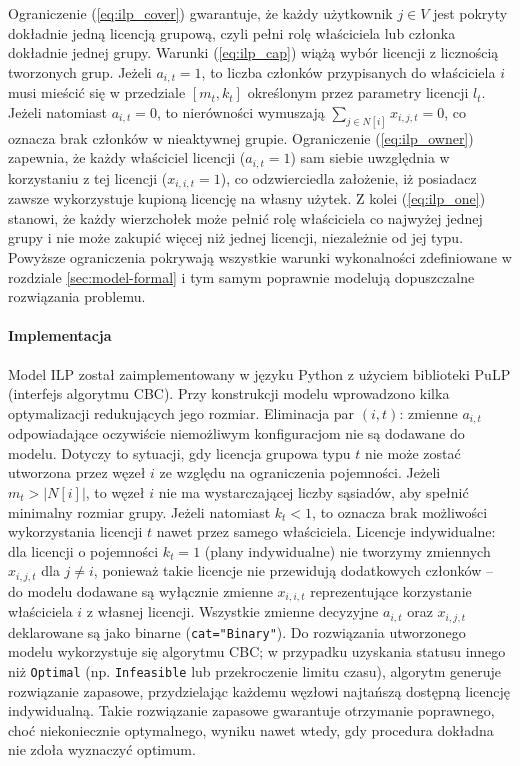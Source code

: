 Ograniczenie (\ref{eq:ilp_cover}) gwarantuje, że każdy użytkownik $j \in V$ jest pokryty dokładnie jedną licencją grupową, czyli pełni rolę właściciela lub członka dokładnie jednej grupy. Warunki (\ref{eq:ilp_cap}) wiążą wybór licencji z licznością tworzonych grup. Jeżeli $a_{i,t}=1$, to liczba członków przypisanych do właściciela $i$ musi mieścić się w przedziale $[m_t,k_t]$ określonym przez parametry licencji $l_t$. Jeżeli natomiast $a_{i,t}=0$, to nierówności wymuszają $\sum_{j \in N[i]} x_{i,j,t} = 0$, co oznacza brak członków w nieaktywnej grupie. Ograniczenie (\ref{eq:ilp_owner}) zapewnia, że każdy właściciel licencji ($a_{i,t}=1$) sam siebie uwzględnia w korzystaniu z tej licencji ($x_{i,i,t}=1$), co odzwierciedla założenie, iż posiadacz zawsze wykorzystuje kupioną licencję na własny użytek. Z kolei (\ref{eq:ilp_one}) stanowi, że każdy wierzchołek może pełnić rolę właściciela co najwyżej jednej grupy i nie może zakupić więcej niż jednej licencji, niezależnie od jej typu. Powyższe ograniczenia pokrywają wszystkie warunki wykonalności zdefiniowane w rozdziale \ref{sec:model-formal} i tym samym poprawnie modelują dopuszczalne rozwiązania problemu.

\paragraph{Implementacja}
Model ILP został zaimplementowany w języku Python z użyciem biblioteki PuLP (interfejs algorytmu CBC). Przy konstrukcji modelu wprowadzono kilka optymalizacji redukujących jego rozmiar. Eliminacja par $(i,t)$: zmienne $a_{i,t}$ odpowiadające oczywiście niemożliwym konfiguracjom nie są dodawane do modelu. Dotyczy to sytuacji, gdy licencja grupowa typu $t$ nie może zostać utworzona przez węzeł $i$ ze względu na ograniczenia pojemności. Jeżeli $m_t > |N[i]|$, to węzeł $i$ nie ma wystarczającej liczby sąsiadów, aby spełnić minimalny rozmiar grupy. Jeżeli natomiast $k_t < 1$, to oznacza brak możliwości wykorzystania licencji $t$ nawet przez samego właściciela. Licencje indywidualne: dla licencji o pojemności $k_t = 1$ (plany indywidualne) nie tworzymy zmiennych $x_{i,j,t}$ dla $j \neq i$, ponieważ takie licencje nie przewidują dodatkowych członków -- do modelu dodawane są wyłącznie zmienne $x_{i,i,t}$ reprezentujące korzystanie właściciela $i$ z własnej licencji. Wszystkie zmienne decyzyjne $a_{i,t}$ oraz $x_{i,j,t}$ deklarowane są jako binarne (\verb|cat="Binary"|). Do rozwiązania utworzonego modelu wykorzystuje się algorytmu CBC; w przypadku uzyskania statusu innego niż \texttt{Optimal} (np. \texttt{Infeasible} lub przekroczenie limitu czasu), algorytm generuje rozwiązanie zapasowe, przydzielając każdemu węzłowi najtańszą dostępną licencję indywidualną. Takie rozwiązanie zapasowe gwarantuje otrzymanie poprawnego, choć niekoniecznie optymalnego, wyniku nawet wtedy, gdy procedura dokładna nie zdoła wyznaczyć optimum.

